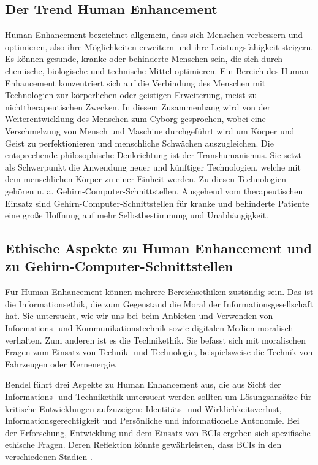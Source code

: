 \documentclass[11pt,ngerman,parskip=half]{scrartcl}
\begin{document}
\subsection{Der Trend Human Enhancement}
\label{subsec:kathrin_der_trend_human_enhancement}
Human Enhancement bezeichnet allgemein, dass sich Menschen verbessern und
optimieren, also ihre Möglichkeiten erweitern und ihre Leistungsfähigkeit
steigern. Es können gesunde, kranke oder behinderte Menschen sein, die sich
durch chemische, biologische und technische Mittel optimieren.
\parencite[vgl.][]{bendel_definition:_2018}
Ein Bereich des Human Enhancement konzentriert sich auf die Verbindung des
Menschen mit Technologien zur körperlichen oder geistigen Erweiterung, meist
zu nichttherapeutischen Zwecken. In diesem Zusammenhang wird von der
Weiterentwicklung des Menschen zum Cyborg gesprochen, wobei eine
Verschmelzung von Mensch und Maschine durchgeführt wird um Körper und Geist
zu perfektionieren und menschliche Schwächen auszugleichen.
\parencite[vgl.][75]{bendel_human_2015} Die entsprechende philosophische
Denkrichtung ist der Transhumanismus. Sie setzt als Schwerpunkt die Anwendung
neuer und künftiger Technologien, welche mit dem menschlichen Körper zu einer
Einheit werden. Zu diesen Technologien gehören u. a.
Gehirn-Computer-Schnittstellen.
\parencite[vgl.][]{edlmeier_transhumanismus_2018} Ausgehend vom
therapeutischen Einsatz sind Gehirn-Computer-Schnittstellen für kranke und
behinderte Patiente eine große Hoffnung auf mehr Selbstbestimmung und
Unabhängigkeit.

\subsection{Ethische Aspekte zu Human Enhancement und zu Gehirn-Computer-Schnittstellen}
\label{subsec:kathrin_ethische_aspekte_zu_human_enhancement_und_zu_gehirn-computer-schnittstellen}
Für Human Enhancement können mehrere Bereichsethiken zuständig sein. Das ist
die Informationsethik, die zum Gegenstand die Moral der
Informationsgesellschaft hat. Sie untersucht, wie wir uns bei beim Anbieten
und Verwenden von Informations- und Kommunikationstechnik sowie digitalen
Medien moralisch verhalten. \parencite[][77--78]{bendel_human_2015}
Zum anderen ist es die Technikethik. Sie befasst sich mit moralischen Fragen
zum Einsatz von Technik- und Technologie, beispielsweise die Technik von
Fahrzeugen oder Kernenergie. \parencite[][78]{bendel_human_2015}

Bendel führt drei Aspekte zu Human Enhancement aus, die aus Sicht der
Informations- und Technikethik untersucht werden sollten um Lösungsansätze
für kritische Entwicklungen aufzuzeigen: Identitäts- und
Wirklichkeitsverlust, Informationsgerechtigkeit und Persönliche und
informationelle Autonomie. \parencite[][78--80]{bendel_human_2015}
Bei der Erforschung, Entwicklung und dem Einsatz von BCIs ergeben sich
spezifische ethische Fragen. Deren Reflektion könnte gewährleisten, dass BCIs
in den verschiedenen Stadien
.
\end{document}
